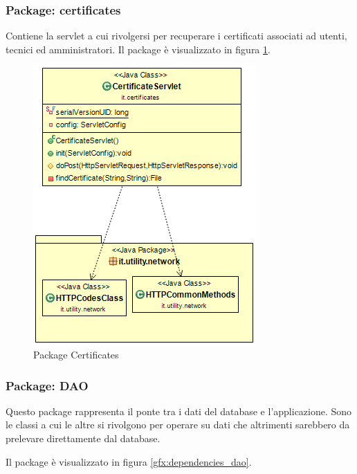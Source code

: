 \subsubsection{Package: \textbf{certificates}}

Contiene la servlet a cui rivolgersi per recuperare i certificati associati ad utenti, tecnici ed amministratori.
Il package è visualizzato in figura \ref{gfx:dependencies_certificates}.

\begin{figure}[!htbp]
	\centering
	\includegraphics[scale = .5]{img/dependencies_certificates}
	\caption{Package Certificates}
	\label{gfx:dependencies_certificates}
\end{figure}

\subsubsection{Package: \textbf{DAO}}

Questo package rappresenta il ponte tra i dati del database e l’applicazione. Sono le classi a cui le altre si rivolgono per operare su dati che altrimenti sarebbero da prelevare direttamente dal database. 

Il package è visualizzato in figura \ref{gfx:dependencies_dao}.

